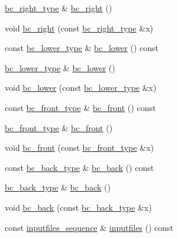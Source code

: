 \begin{DoxyCompactItemize}
\item 
\hyperlink{classsetting__t_a958fcc958aca728509db3a1f3756a0c9}{bc\+\_\+right\+\_\+type} \& \hyperlink{classsetting__t_a36aef289653aa0b588e21976596bbddd}{bc\+\_\+right} ()
\item 
void \hyperlink{classsetting__t_afc70c5ba0db9fd7e6a11cbd61d851792}{bc\+\_\+right} (const \hyperlink{classsetting__t_a958fcc958aca728509db3a1f3756a0c9}{bc\+\_\+right\+\_\+type} \&x)
\item 
const \hyperlink{classsetting__t_a69864ad49075236ce00f2a73cdcbb13b}{bc\+\_\+lower\+\_\+type} \& \hyperlink{classsetting__t_aa836fa6e6f9d0449e97525adfe1a84f3}{bc\+\_\+lower} () const 
\item 
\hyperlink{classsetting__t_a69864ad49075236ce00f2a73cdcbb13b}{bc\+\_\+lower\+\_\+type} \& \hyperlink{classsetting__t_a2126a880336ebfe32cb08de2b4a8f0ff}{bc\+\_\+lower} ()
\item 
void \hyperlink{classsetting__t_a36c09e2bdd9d2f181121d68a680b38c3}{bc\+\_\+lower} (const \hyperlink{classsetting__t_a69864ad49075236ce00f2a73cdcbb13b}{bc\+\_\+lower\+\_\+type} \&x)
\item 
const \hyperlink{classsetting__t_a6010c9a9fc3ce2a4d583aa4bf07f650c}{bc\+\_\+front\+\_\+type} \& \hyperlink{classsetting__t_a851f5f952aa5944b6e0a210d72c5d77f}{bc\+\_\+front} () const 
\item 
\hyperlink{classsetting__t_a6010c9a9fc3ce2a4d583aa4bf07f650c}{bc\+\_\+front\+\_\+type} \& \hyperlink{classsetting__t_ad98cacb6ca2901b497ab145a2ea5b20e}{bc\+\_\+front} ()
\item 
void \hyperlink{classsetting__t_a70376039c5cf105deb424892b0e499ad}{bc\+\_\+front} (const \hyperlink{classsetting__t_a6010c9a9fc3ce2a4d583aa4bf07f650c}{bc\+\_\+front\+\_\+type} \&x)
\item 
const \hyperlink{classsetting__t_a5deb32969da7832b53abbf0564142627}{bc\+\_\+back\+\_\+type} \& \hyperlink{classsetting__t_adcca0a70b1f13a9656d281f8418fa9b3}{bc\+\_\+back} () const 
\item 
\hyperlink{classsetting__t_a5deb32969da7832b53abbf0564142627}{bc\+\_\+back\+\_\+type} \& \hyperlink{classsetting__t_a313039e373bc19f88bbd86159a870d8a}{bc\+\_\+back} ()
\item 
void \hyperlink{classsetting__t_a7b327419fab7173075a8bb8534c42b38}{bc\+\_\+back} (const \hyperlink{classsetting__t_a5deb32969da7832b53abbf0564142627}{bc\+\_\+back\+\_\+type} \&x)
\item 
const \hyperlink{classsetting__t_a7f069827c89edb95e2b4347f1484b7b3}{inputfiles\+\_\+sequence} \& \hyperlink{classsetting__t_a7844a4db31a693836a7653e47fc89b20}{inputfiles} () const 

\end{DoxyCompactItemize}

